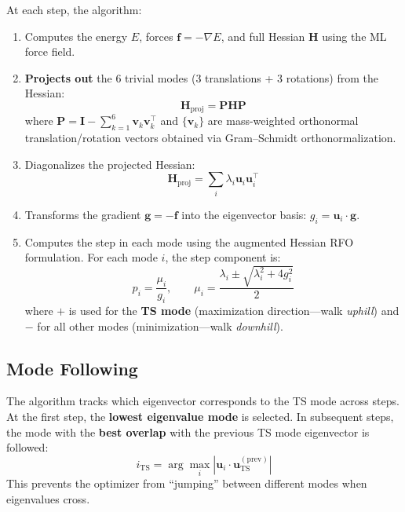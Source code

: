 \documentclass[11pt,a4paper]{article}
\begin{document}
At each step, the algorithm:
\begin{enumerate}
    \item Computes the energy $E$, forces $\mathbf{f} = -\nabla E$, and full Hessian $\mathbf{H}$ using the ML force field.
    \item \textbf{Projects out} the 6 trivial modes (3 translations + 3 rotations) from the Hessian:
    \begin{equation}
        \mathbf{H}_\text{proj} = \mathbf{P} \mathbf{H} \mathbf{P}
    \end{equation}
    where $\mathbf{P} = \mathbf{I} - \sum_{k=1}^{6} \mathbf{v}_k \mathbf{v}_k^\top$ and $\{\mathbf{v}_k\}$ are mass-weighted orthonormal translation/rotation vectors obtained via Gram--Schmidt orthonormalization.
    \item Diagonalizes the projected Hessian:
    \begin{equation}
        \mathbf{H}_\text{proj} = \sum_i \lambda_i \mathbf{u}_i \mathbf{u}_i^\top
    \end{equation}
    \item Transforms the gradient $\mathbf{g} = -\mathbf{f}$ into the eigenvector basis: $g_i = \mathbf{u}_i \cdot \mathbf{g}$.
    \item Computes the step in each mode using the augmented Hessian RFO formulation. For each mode $i$, the step component is:
    \begin{equation}
        p_i = \frac{\mu_i}{g_i}, \qquad \mu_i = \frac{\lambda_i \pm \sqrt{\lambda_i^2 + 4g_i^2}}{2}
    \end{equation}
    where $+$ is used for the \textbf{TS mode} (maximization direction---walk \emph{uphill}) and $-$ for all other modes (minimization---walk \emph{downhill}).
\end{enumerate}

\subsection{Mode Following}

The algorithm tracks which eigenvector corresponds to the TS mode across steps. At the first step, the \textbf{lowest eigenvalue mode} is selected. In subsequent steps, the mode with the \textbf{best overlap} with the previous TS mode eigenvector is followed:
\begin{equation}
    i_\text{TS} = \arg\max_i \left| \mathbf{u}_i \cdot \mathbf{u}_\text{TS}^{(\text{prev})} \right|
\end{equation}
This prevents the optimizer from ``jumping'' between different modes when eigenvalues cross.
\end{document}
